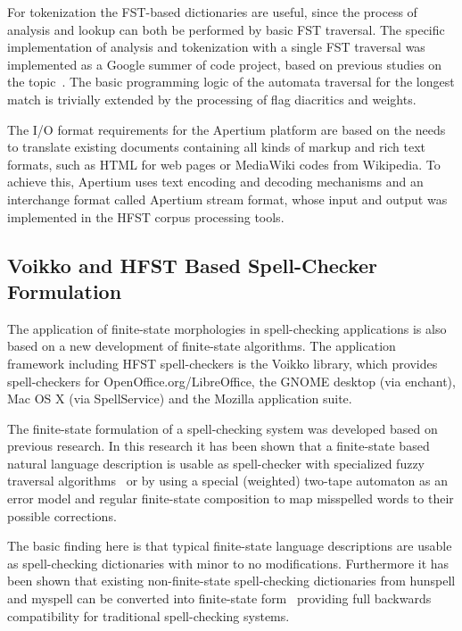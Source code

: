 \documentclass{llncs}
\begin{document}
For tokenization the FST-based dictionaries are useful, since the process of
analysis and lookup can both be performed by basic FST traversal. The specific
implementation of analysis and tokenization with a single FST traversal was
implemented as a Google summer of code project, based on previous studies on
the topic~\cite{garrido-alenda/2002}. The basic programming logic of the automata traversal
for the longest match is trivially extended by the processing of flag diacritics
and weights.

The I/O format requirements for the Apertium platform are based on the needs to
translate existing documents containing all kinds of markup and rich text
formats, such as HTML for web pages or MediaWiki codes from Wikipedia. To
achieve this, Apertium uses text encoding and decoding mechanisms and
an interchange format called Apertium stream format, whose input and output
was implemented in the HFST corpus processing tools.

\subsection{Voikko and HFST Based Spell-Checker Formulation}\label{spellcheck}
The application of finite-state morphologies in spell-checking applications
is also based on a new development of finite-state algorithms. The application
framework including HFST spell-checkers is the Voikko library, which provides
spell-checkers for OpenOffice.org/LibreOffice, the GNOME desktop (via
enchant), Mac OS X (via SpellService) and the Mozilla application suite.

The finite-state formulation of a spell-checking system was developed based on
previous research. In this research it has been shown that a finite-state based
natural language description is usable as spell-checker with specialized fuzzy
traversal algorithms~\cite{oflazer/1996,hulden/2009} or by using a special
(weighted) two-tape automaton as an error model and regular finite-state
composition to map misspelled words to their possible
corrections\cite{agata/2002,pirinen/2010/lrec}.
 
The basic finding here is that typical finite-state language descriptions are
usable as spell-checking dictionaries with minor to no modifications.
Furthermore it has been shown that existing non-finite-state spell-checking
dictionaries from hunspell and myspell can be converted into finite-state
form~\cite{pirinen/2010/cla} providing full backwards compatibility for
traditional spell-checking systems.
\end{document}
